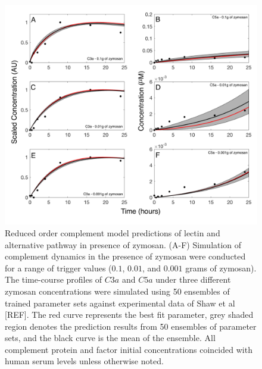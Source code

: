 \documentclass[12pt]{article}
\begin{document}
\begin{figure}[h]
\centering
\includegraphics[width=1.0\textwidth]{./figs/Figure3_Predictions_2.pdf}
\caption{Reduced order complement model predictions of lectin and alternative pathway in presence of zymosan. (A-F) Simulation of complement dynamics in the presence of zymosan were conducted for a range of trigger values ($0.1$, $0.01$, and $0.001$ grams of zymosan). The time-course profiles of $C3a$ and $C5a$ under three different zymosan concentrations were simulated using 50 ensembles of trained parameter sets against experimental data of Shaw et al [REF].  The red curve represents the best fit parameter, grey shaded region denotes the prediction results from 50 ensembles of parameter sets, and the black curve is the mean of the ensemble. All complement protein and factor initial concentrations coincided with human serum levels unless otherwise noted.}\label{fig-prediction}
\end{figure}
\end{document}
